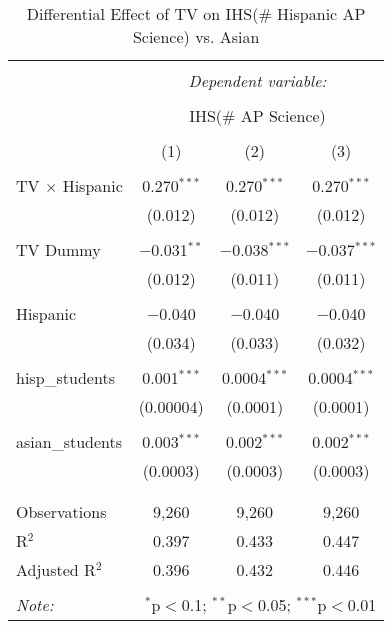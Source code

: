 
\begin{table}[!htbp] \centering 
  \caption{Differential Effect of TV on IHS(\# Hispanic AP Science) vs. Asian} 
  \label{} 
\begin{tabular}{@{\extracolsep{-2pt}}lccc} 
\\[-1.8ex]\hline 
\hline \\[-1.8ex] 
 & \multicolumn{3}{c}{\textit{Dependent variable:}} \\ 
\cline{2-4} 
\\[-1.8ex] & \multicolumn{3}{c}{IHS(\# AP Science)} \\ 
\\[-1.8ex] & (1) & (2) & (3)\\ 
\hline \\[-1.8ex] 
 TV $\times$ Hispanic & 0.270$^{***}$ & 0.270$^{***}$ & 0.270$^{***}$ \\ 
  & (0.012) & (0.012) & (0.012) \\ 
  & & & \\ 
 TV Dummy & $-$0.031$^{**}$ & $-$0.038$^{***}$ & $-$0.037$^{***}$ \\ 
  & (0.012) & (0.011) & (0.011) \\ 
  & & & \\ 
 Hispanic & $-$0.040 & $-$0.040 & $-$0.040 \\ 
  & (0.034) & (0.033) & (0.032) \\ 
  & & & \\ 
 hisp\_students & 0.001$^{***}$ & 0.0004$^{***}$ & 0.0004$^{***}$ \\ 
  & (0.00004) & (0.0001) & (0.0001) \\ 
  & & & \\ 
 asian\_students & 0.003$^{***}$ & 0.002$^{***}$ & 0.002$^{***}$ \\ 
  & (0.0003) & (0.0003) & (0.0003) \\ 
  & & & \\ 
\hline \\[-1.8ex] 
Observations & 9,260 & 9,260 & 9,260 \\ 
R$^{2}$ & 0.397 & 0.433 & 0.447 \\ 
Adjusted R$^{2}$ & 0.396 & 0.432 & 0.446 \\ 
\hline 
\hline \\[-1.8ex] 
\textit{Note:}  & \multicolumn{3}{r}{$^{*}$p$<$0.1; $^{**}$p$<$0.05; $^{***}$p$<$0.01} \\ 
\end{tabular} 
\end{table} 
